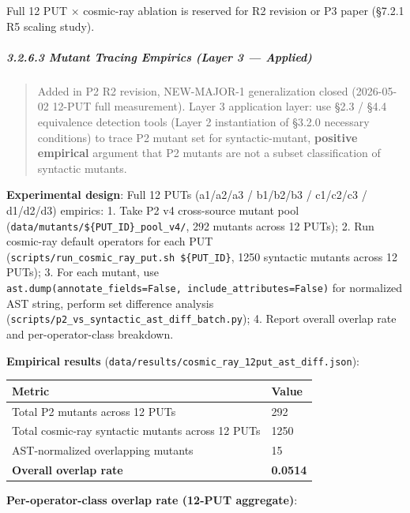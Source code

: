 \documentclass[review,12pt,authoryear]{elsarticle}
\begin{document}
Full 12 PUT $\times$ cosmic-ray ablation is reserved for R2 revision or P3
paper (§7.2.1 R5 scaling study).

\subparagraph{3.2.6.3 Mutant Tracing Empirics (Layer 3 ---
Applied)}\label{mutant-tracing-empirics-layer-3-applied}

\begin{quote}
Added in P2 R2 revision, NEW-MAJOR-1 generalization closed (2026-05-02
12-PUT full measurement). Layer 3 application layer: use §2.3 / §4.4
equivalence detection tools (Layer 2 instantiation of §3.2.0 necessary
conditions) to trace P2 mutant set for syntactic-mutant,
\textbf{positive empirical} argument that P2 mutants are not a subset
classification of syntactic mutants.
\end{quote}

\textbf{Experimental design}: Full 12 PUTs (a1/a2/a3 / b1/b2/b3 /
c1/c2/c3 / d1/d2/d3) empirics: 1. Take P2 v4 cross-source mutant pool
(\texttt{data/mutants/\$\{PUT\_ID\}\_pool\_v4/}, 292 mutants across 12
PUTs); 2. Run cosmic-ray default operators for each PUT
(\texttt{scripts/run\_cosmic\_ray\_put.sh\ \$\{PUT\_ID\}}, 1250
syntactic mutants across 12 PUTs); 3. For each mutant, use
\texttt{ast.dump(annotate\_fields=False,\ include\_attributes=False)}
for normalized AST string, perform set difference analysis
(\texttt{scripts/p2\_vs\_syntactic\_ast\_diff\_batch.py}); 4. Report
overall overlap rate and per-operator-class breakdown.

\textbf{Empirical results}
(\texttt{data/results/cosmic\_ray\_12put\_ast\_diff.json}):

{\def\LTcaptype{none} %
\begin{longtable}[]{@{}ll@{}}
\toprule\noalign{}
Metric & Value \\
\midrule\noalign{}
\endhead
\bottomrule\noalign{}
\endlastfoot
Total P2 mutants across 12 PUTs & 292 \\
Total cosmic-ray syntactic mutants across 12 PUTs & 1250 \\
AST-normalized overlapping mutants & 15 \\
\textbf{Overall overlap rate} & \textbf{0.0514} \\
\end{longtable}
}

\textbf{Per-operator-class overlap rate (12-PUT aggregate)}:
\end{document}

